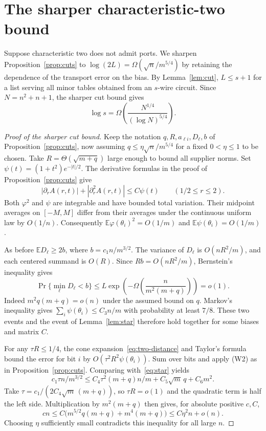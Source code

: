 \documentclass[11pt]{article}
\theoremstyle{remark}
\newcommand{\E}{\mathbb E}
\begin{document}
\appendix
\section{The sharper characteristic-two bound}\label{app:sharp-two}
Suppose characteristic two does not admit ports. We sharpen
Proposition~\ref{prop:cuts} to
\(\log(2L)=\Omega(\sqrt n/m^{5/4})\) by retaining the dependence of
the transport error on the bias. By Lemma~\ref{lem:cut}, \(L\le s+1\)
for a list serving all minor tables obtained from an \(s\)-wire circuit.
Since \(N=n^2+n+1\), the sharper cut bound gives
\begin{equation}\label{eq:two-quant}
 \log s=\Omega\!\left(\frac{N^{1/4}}{(\log N)^{5/4}}\right).
\end{equation}

\begin{proof}[Proof of the sharper cut bound]
Keep the notation \(q,R,a_{\ell i},D_\ell,b\) of
Proposition~\ref{prop:cuts}, now assuming
\(q\le\eta\sqrt n/m^{5/4}\) for a fixed \(0<\eta\le1\) to be chosen.
Take \(R=\Theta(\sqrt{m+q})\) large enough to bound all supplier norms.
Set \(\psi(t)=(1+t^2)e^{-|t|/2}\).
The derivative formulas in the proof of Proposition~\ref{prop:cuts} give
\[
 |\partial_r A(r,t)|+|\partial_r^2 A(r,t)|\le C\psi(t)
 \qquad(1/2\le r\le2).
\]
Both \(\varphi^2\) and \(\psi\) are integrable and have bounded total
variation. Their midpoint averages on \([-M,M]\) differ from their
averages under the continuous uniform law by \(O(1/n)\). Consequently
\(\E\varphi(\theta_i)^2=O(1/m)\) and \(\E\psi(\theta_i)=O(1/m)\).

As before \(\E D_\ell\ge 2b\), where \(b=c_1n/m^{3/2}\).
The variance of \(D_\ell\) is \(O(nR^2/m)\), and each centered summand
is \(O(R)\). Since \(Rb=O(nR^2/m)\), Bernstein's inequality gives
\[
 \Pr\{\min_\ell D_\ell<b\}
 \le L\exp\!\left(-\Omega\!\left(\frac{n}{m^2(m+q)}\right)\right)=o(1).
\]
Indeed \(m^2q(m+q)=o(n)\) under the assumed bound on \(q\).
Markov's inequality gives \(\sum_i\psi(\theta_i)\le C_3n/m\) with
probability at least \(7/8\). These two events and the event of
Lemma~\ref{lem:star} therefore hold together for some biases and matrix \(C\).

For any \(\tau R\le1/4\), the cone expansion~\eqref{eq:two-distance}
and Taylor's formula bound the error for bit \(i\) by
\(O(\tau^2R^2\psi(\theta_i))\). Sum over bits and apply (W2) as in
Proposition~\ref{prop:cuts}. Comparing with~\eqref{eq:star} yields
\[
 c_1\tau n/m^{3/2}
 \le C_4\tau^2(m+q)n/m+C_5\sqrt m\,q+C_6m^2 .
\]
Take \(\tau=c_1/(2C_4\sqrt m\,(m+q))\), so \(\tau R=o(1)\) and the
quadratic term is half the left side. Multiplication by \(m^2(m+q)\)
then gives, for absolute positive \(c,C\),
\[
 c n\le C\bigl(m^{5/2}q(m+q)+m^4(m+q)\bigr)
       \le C\eta^2 n+o(n).
\]
Choosing \(\eta\) sufficiently small contradicts this inequality for all
large \(n\).
\end{proof}
\end{document}
